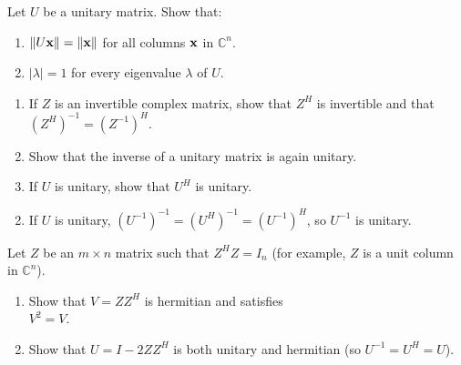 \begin{multicols}{2}
\begin{ex}
\begin{sol}
\begin{enumerate}[label={\alph*.}]
\end{enumerate}
\end{sol}
\end{ex}

\begin{ex}
Let $U$ be a unitary matrix. Show that:

\begin{enumerate}[label={\alph*.}]
\item $\| U\textbf{x} \| = \| \textbf{x} \|$ for all columns $\textbf{x}$ in $\mathbb{C}^n$.

\item $|\lambda| = 1$ for every eigenvalue $\lambda$ of $U$.

\end{enumerate}
\end{ex}


\begin{ex}
\begin{enumerate}[label={\alph*.}]
\item If $Z$ is an invertible complex matrix, show that $Z^{H}$ is invertible and that $(Z^{H})^{-1} = (Z^{-1})^{H}$.

\item Show that the inverse of a unitary matrix is again unitary.

\item If $U$ is unitary, show that $U^{H}$ is unitary.

\end{enumerate}
\begin{sol}
\begin{enumerate}[label={\alph*.}]
\setcounter{enumi}{1}
\item  If $U$ is unitary, $(U^{-1})^{-1} = (U^{H})^{-1} = (U^{-1})^{H}$, so $U^{-1}$ is unitary.

\end{enumerate}
\end{sol}
\end{ex}

\begin{ex}
Let $Z$ be an $m \times n$ matrix such that $Z^{H}Z = I_{n}$ (for example, $Z$ is a unit column in $\mathbb{C}^n$).

\begin{enumerate}[label={\alph*.}]
\item Show that $V = ZZ^{H}$ is hermitian and satisfies \\ $V^{2} = V$.

\item Show that $U = I - 2ZZ^{H}$ is both unitary and hermitian (so $U^{-1} = U^{H} = U$).


\end{enumerate}
\end{ex}
\end{multicols}
